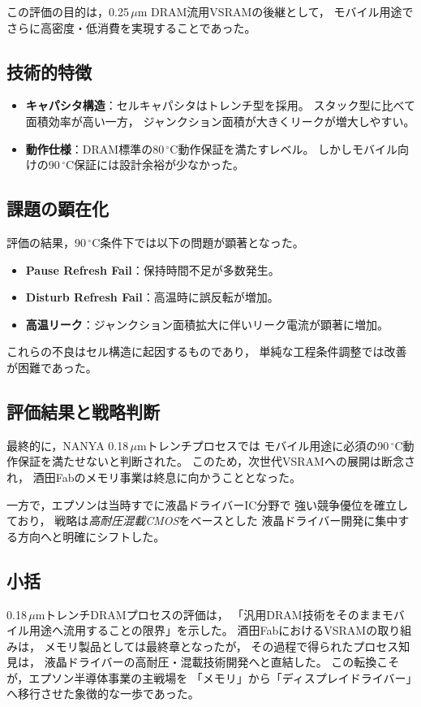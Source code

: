 \documentclass[conference]{IEEEtran}
\begin{document}
この評価の目的は，0.25\,$\mu$m DRAM流用VSRAMの後継として，
モバイル用途でさらに高密度・低消費を実現することであった。

\subsection{技術的特徴}
\begin{itemize}
  \item \textbf{キャパシタ構造}：セルキャパシタはトレンチ型を採用。
        スタック型に比べて面積効率が高い一方，
        ジャンクション面積が大きくリークが増大しやすい。
  \item \textbf{動作仕様}：DRAM標準の80\,$^\circ$C動作保証を満たすレベル。
        しかしモバイル向けの90\,$^\circ$C保証には設計余裕が少なかった。
\end{itemize}

\subsection{課題の顕在化}
評価の結果，90\,$^\circ$C条件下では以下の問題が顕著となった。
\begin{itemize}
  \item \textbf{Pause Refresh Fail}：保持時間不足が多数発生。
  \item \textbf{Disturb Refresh Fail}：高温時に誤反転が増加。
  \item \textbf{高温リーク}：ジャンクション面積拡大に伴いリーク電流が顕著に増加。
\end{itemize}

これらの不良はセル構造に起因するものであり，
単純な工程条件調整では改善が困難であった。

\subsection{評価結果と戦略判断}
最終的に，NANYA 0.18\,$\mu$mトレンチプロセスでは
モバイル用途に必須の90\,$^\circ$C動作保証を満たせないと判断された。
このため，次世代VSRAMへの展開は断念され，
酒田Fabのメモリ事業は終息に向かうこととなった。

一方で，エプソンは当時すでに液晶ドライバーIC分野で
強い競争優位を確立しており，
戦略は\emph{高耐圧混載CMOS}をベースとした
液晶ドライバー開発に集中する方向へと明確にシフトした。

\subsection{小括}
0.18\,$\mu$mトレンチDRAMプロセスの評価は，
「汎用DRAM技術をそのままモバイル用途へ流用することの限界」を示した。
酒田FabにおけるVSRAMの取り組みは，
メモリ製品としては最終章となったが，
その過程で得られたプロセス知見は，
液晶ドライバーの高耐圧・混載技術開発へと直結した。
この転換こそが，エプソン半導体事業の主戦場を
「メモリ」から「ディスプレイドライバー」へ移行させた象徴的な一歩であった。
\end{document}
